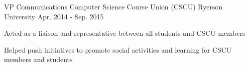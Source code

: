 \begin{cventries}
{\begin{cvitems}
      \end{cvitems}
    }
  \cventry
    {VP Communications}
    {Computer Science Course Union (CSCU)}
    {Ryerson University}
    {Apr. 2014 - Sep. 2015}
    {
      \begin{cvitems}
        \item {Acted as a liaison and representative between all students and CSCU members}
        \item {Helped push initiatives to promote social activities and learning for CSCU members and students}
      \end{cvitems}
      }
\end{cventries}